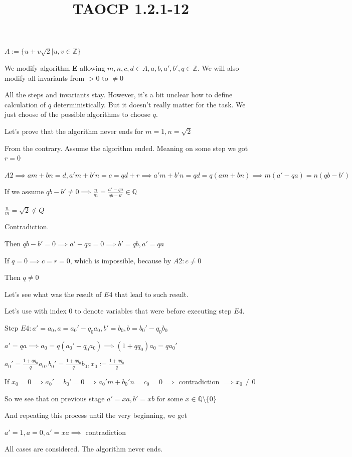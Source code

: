 \documentclass{article}
\title{TAOCP 1.2.1\mbox{-}12}
\begin{document}
\maketitle

\( A := \{ u + v \sqrt{2} | u, v \in \mathbb{Z} \} \)

We modify algorithm \textbf{E} allowing \( m, n, c, d \in A, a, b, a', b', q \in \mathbb{Z} \). We will also modify all invariants from \( > 0 \) to \( \neq 0 \)

All the steps and invariants stay. However, it's a bit unclear how to define calculation of \( q \) deterministically. But it doesn't really matter for the task. We just choose of the possible algorithms to choose \( q \).

Let's prove that the algorithm never ends for \( m = 1, n = \sqrt{2} \)

From the contrary. Assume the algorithm ended. Meaning on some step we got \( r = 0 \)

\( A2 \implies am + bn = d, a'm+b'n = c = qd + r \implies a'm+b'n = qd = q(am+bn) \implies m(a'-qa) = n(qb-b') \)

If we assume \( qb - b' \neq 0 \implies \frac{n}{m} = \frac{a'-qa}{qb-b'} \in \mathbb{Q} \)

\( \frac{n}{m} = \sqrt{2} \notin Q \)

Contradiction.

Then \( qb - b' = 0 \implies a' - qa = 0 \implies b' = qb, a' = qa \)

If \( q = 0 \implies c = r = 0 \), which is impossible, because by \( A2: c \neq 0 \)

Then \( q \neq 0 \)

Let's see what was the result of \( E4 \) that lead to such result.

Let's use with index \( 0 \) to denote variables that were before executing step \( E4 \).

Step \( E4: a' = a_{0}, a = a_{0}' - q_{0}a_{0}, b' = b_{0}, b = b_{0}' - q_{0}b_{0} \)

\( a'=qa \implies a_{0} = q(a_{0}'-q_{0}a_{0}) \implies (1 + qq_{0})a_{0} = q a_{0}' \)

\( a_{0}' = \frac{1+qq_{0}}{q}a_{0}, b_{0}' = \frac{1+qq_{0}}{q}b_{0}, x_{0} := \frac{1+qq_{0}}{q} \)

If \( x_{0} = 0 \implies a_{0}'=b_{0}'=0 \implies a_{0}'m+b_{0}'n=c_{0}=0 \implies \) contradiction \( \implies x_{0} \neq 0 \)

So we see that on previous stage \( a' = xa, b' = xb \) for some \( x \in \mathbb{Q} \setminus \{ 0 \} \)

And repeating this process until the very beginning, we get

\( a'=1, a = 0, a'=xa \implies \) contradiction

All cases are considered. The algorithm never ends.
\end{document}
